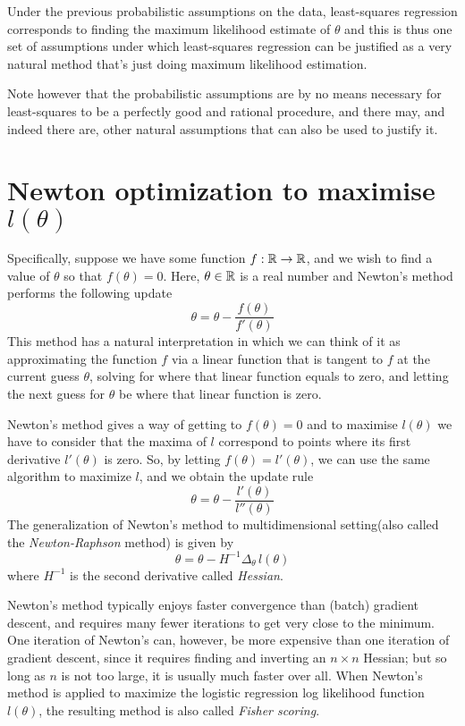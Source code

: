 Under the previous probabilistic assumptions on the data, least-squares regression corresponds
to finding the maximum likelihood estimate of $\theta$ and this is thus one set of assumptions 
under which least-squares regression can be justified as a very natural method that’s just 
doing maximum likelihood estimation.

Note however that the probabilistic assumptions are by no means necessary for least-squares to be 
a perfectly good and rational procedure, and there may, and indeed there are, other natural assumptions
that can also be used to justify it.

\section{Newton optimization to maximise $l(\theta)$}
Specifically, suppose we have some function $f:\mathbb{R} \to \mathbb{R}$, and we wish to find a value of $\theta$
so that $f(\theta) = 0$.\newline
Here, $\theta \in \mathbb{R}$ is a real number and Newton’s method performs the following update
\[ \theta = \theta - \frac{f(\theta)}{f'(\theta)} \]
This method has a natural interpretation in which we can think of it as approximating the function $f$
via a linear function that is tangent to $f$ at the current guess $\theta$, solving for where that 
linear function equals to zero, and letting the next guess for $\theta$ be where that linear function is zero.

Newton’s method gives a way of getting to $f(\theta) = 0$ and to maximise $l(\theta)$ we have to consider that
the maxima of $l$ correspond to points where its first derivative $l'(\theta)$ is zero.\newline
So, by letting $f(\theta) = l'(\theta)$, we can use the same algorithm to maximize $l$, and we obtain the update rule
\[ \theta = \theta - \frac{l'(\theta)}{l''(\theta)} \]
The generalization of Newton’s method to multidimensional setting(also called the \emph{Newton-Raphson} method)
is given by 
\[ \theta = \theta - H^{-1} \Delta _{\theta} \, l(\theta) \]
where $H^{-1}$ is the second derivative called \emph{Hessian}.

Newton’s method typically enjoys faster convergence than (batch) gradient descent, and requires
many fewer iterations to get very close to the minimum.\newline
One iteration of Newton’s can, however, be more expensive than one iteration of gradient descent,
since it requires finding and inverting an $n \times n$ Hessian; but so long as $n$ is not too large,
it is usually much faster over all.\newline
When Newton’s method is applied to maximize the logistic regression log likelihood function $l(\theta)$,
the resulting method is also called \emph{Fisher scoring}.



